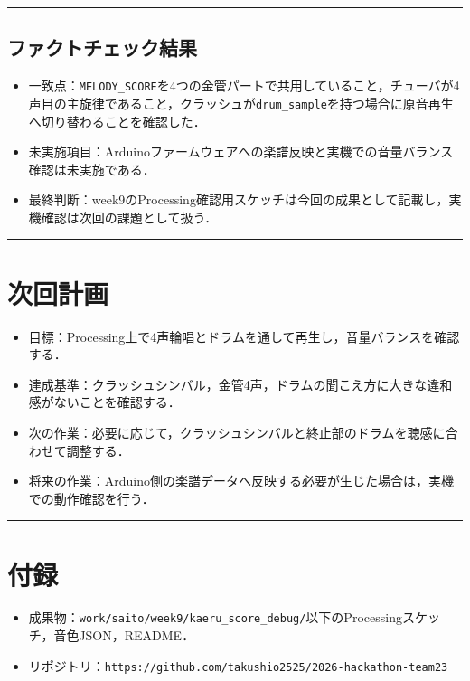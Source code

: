 \documentclass[uplatex,dvipdfmx,a4paper,11pt]{jsarticle}
\newcommand{\sectionrule}{\par\medskip\noindent\rule{\linewidth}{0.6pt}\par\medskip}
\begin{document}
\sectionrule

\subsection{ファクトチェック結果}

\begin{itemize}
  \item 一致点：\texttt{MELODY\_SCORE}を4つの金管パートで共用していること，チューバが4声目の主旋律であること，クラッシュが\texttt{drum\_sample}を持つ場合に原音再生へ切り替わることを確認した．
  \item 未実施項目：Arduinoファームウェアへの楽譜反映と実機での音量バランス確認は未実施である．
  \item 最終判断：week9のProcessing確認用スケッチは今回の成果として記載し，実機確認は次回の課題として扱う．
\end{itemize}

\sectionrule

\section{次回計画}

\begin{itemize}
  \item 目標：Processing上で4声輪唱とドラムを通して再生し，音量バランスを確認する．
  \item 達成基準：クラッシュシンバル，金管4声，ドラムの聞こえ方に大きな違和感がないことを確認する．
  \item 次の作業：必要に応じて，クラッシュシンバルと終止部のドラムを聴感に合わせて調整する．
  \item 将来の作業：Arduino側の楽譜データへ反映する必要が生じた場合は，実機での動作確認を行う．
\end{itemize}

\sectionrule

\section{付録}

\begin{itemize}
  \item 成果物：\texttt{work/saito/week9/kaeru\_score\_debug/}以下のProcessingスケッチ，音色JSON，README．
  \item リポジトリ：\texttt{https://github.com/takushio2525/2026-hackathon-team23}
\end{itemize}
\end{document}
